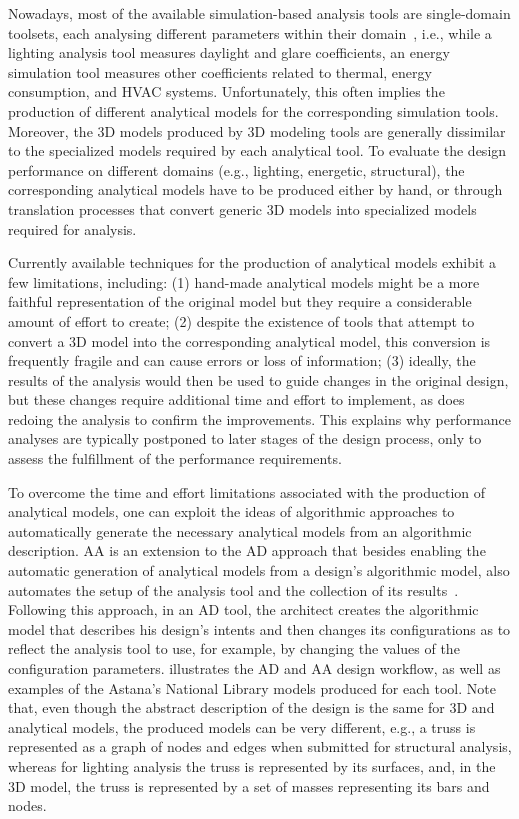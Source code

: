 	Nowadays, most of the available simulation-based analysis tools are single-domain toolsets, each analysing different parameters within their domain~\cite{Malkawi2005}, i.e., while a lighting analysis tool measures daylight and glare coefficients, an energy simulation tool measures other coefficients related to thermal, energy consumption, and \ac{HVAC} systems. Unfortunately, this often implies the production of different analytical models for the corresponding simulation tools. Moreover, the 3D models produced by 3D modeling tools are generally dissimilar to the specialized models required by each analytical tool. To evaluate the design performance on different domains (e.g., lighting, energetic, structural), the corresponding analytical models have to be produced either by hand, or through translation processes that convert generic 3D models into specialized models required for analysis.

	Currently available techniques for the production of analytical models exhibit a few limitations, including: (1) hand-made analytical models might be a more faithful representation of the original model but they require a considerable amount of effort to create; (2) despite the existence of tools that attempt to convert a 3D model into the corresponding analytical model, this conversion is frequently fragile and can cause errors or loss of information; (3) ideally, the results of the analysis would then be used to guide changes in the original design, but these changes require additional time and effort to implement, as does redoing the analysis to confirm the improvements. This explains why performance analyses are typically postponed to later stages of the design process, only to assess the fulfillment of the performance requirements.

	To overcome the time and effort limitations associated with the production of analytical models, one can exploit the ideas of algorithmic approaches to automatically generate the necessary analytical models from an algorithmic description. \ac{AA} is an extension to the \ac{AD} approach that besides enabling the automatic generation of analytical models from a design's algorithmic model, also automates the setup of the analysis tool and the collection of its results~\cite{Aguiar2017}. Following this approach, in an \ac{AD} tool, the architect creates the algorithmic model that describes his design's intents and then changes its configurations as to reflect the analysis tool to use, for example, by changing the values of the configuration parameters.  illustrates the \ac{AD} and \ac{AA} design workflow, as well as examples of the Astana's National Library models produced for each tool. Note that, even though the abstract description of the design is the same for 3D and analytical models, the produced models can be very different, e.g., a truss is represented as a graph of nodes and edges when submitted for structural analysis, whereas for lighting analysis the truss is represented by its surfaces, and, in the 3D model, the truss is represented by a set of masses representing its bars and nodes.

